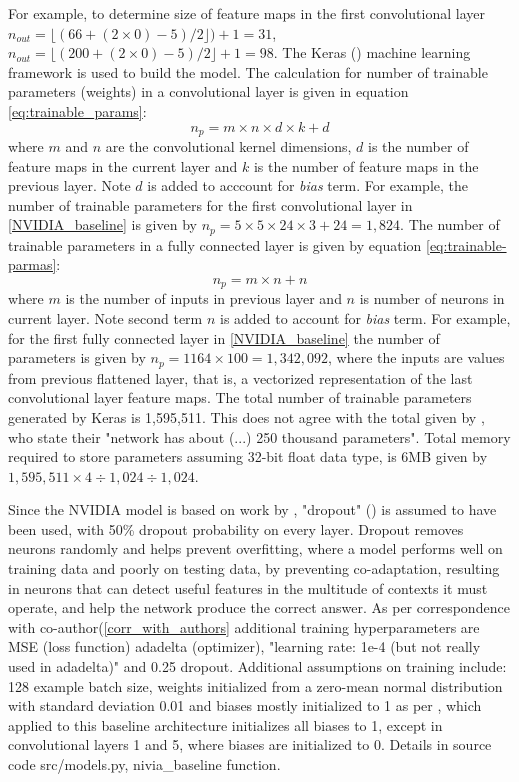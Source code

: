 For example, to determine size of feature maps in the first convolutional layer $n_{out}=\lfloor(66+(2\times0)-5)/2\rfloor)+1=31$, $n_{out}=\lfloor(200+(2\times0)-5)/2\rfloor+1=98$. The Keras (\cite{chollet2015keras}) machine learning framework is used to build the model. The calculation for number of trainable parameters (weights) in a convolutional layer is given in equation \ref{eq:trainable_params}:
\begin{equation}
    \label{eq:trainable_params}
    n_p= m \times n \times  d \times k + d
\end{equation}
where $m$ and $n$ are the convolutional kernel dimensions, $d$ is the number of feature maps in the current layer and $k$ is the number of feature maps in the previous layer. Note $d$ is added to acccount for \textit{bias} term. For example, the number of trainable parameters for the first convolutional layer in \ref{NVIDIA_baseline} is given by $n_p = 5 \times 5 \times 24 \times 3 + 24 = 1,824$. The number of trainable parameters in a fully connected layer is given by equation \ref{eq:trainable-parmas}:
\begin{equation}
    \label{eq:trainable-parmas}
    n_p= m \times n + n
\end{equation}
where $m$ is the number of inputs in previous layer and $n$ is number of neurons in current layer. Note second term $n$ is added to account for \textit{bias} term. For example, for the first fully connected layer in \ref{NVIDIA_baseline} the number of parameters is given by $n_p = 1164 \times 100 = 1,342,092$, where the inputs are values from previous flattened layer, that is, a vectorized representation of the last convolutional layer feature maps.  
The total number of trainable parameters generated by Keras is 1,595,511. This does not agree with the total given by \cite{bojarski2016end}, who state their "network  has  about (...) 250 thousand parameters". Total memory required to store parameters assuming 32-bit float data type, is 6MB given by $1,595,511 \times 4 \div 1,024 \div 1,024$.

Since the NVIDIA model is based on work by \cite{krizhevsky2012imagenet}, "dropout" (\cite{hinton2012improving}) is assumed to have been used, with 50\% dropout probability on every layer.  
Dropout removes neurons randomly and helps prevent overfitting, where a model performs well on training data and poorly on testing data, by preventing co-adaptation, resulting in neurons that can detect useful features in the multitude of contexts it must operate, and help the network produce the correct answer.
As per correspondence with co-author(\ref{corr_with_authors} additional training hyperparameters are MSE (loss function) 
adadelta (optimizer), "learning rate: 1e-4 (but not really used in adadelta)" and 0.25 dropout.
Additional assumptions on training include: 128 example batch size, weights initialized from a zero-mean normal distribution with standard deviation 0.01 and biases mostly initialized to 1 as per \cite{krizhevsky2012imagenet}, which applied to this baseline architecture initializes all biases to 1, except in convolutional layers 1 and 5, where biases are initialized to 0. Details in source code src/models.py, nivia\_baseline function.  


